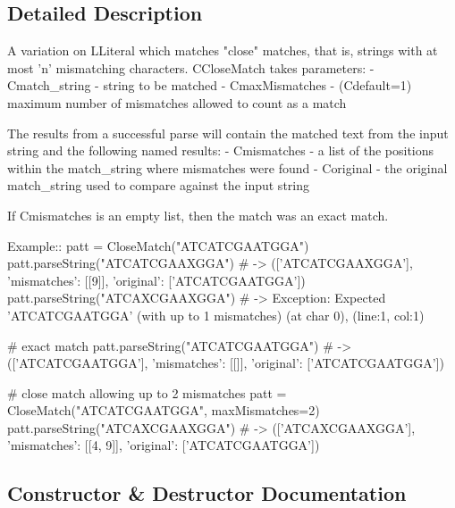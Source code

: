 \subsection{Detailed Description}
\begin{DoxyVerb}A variation on L{Literal} which matches "close" matches, that is, 
strings with at most 'n' mismatching characters. C{CloseMatch} takes parameters:
 - C{match_string} - string to be matched
 - C{maxMismatches} - (C{default=1}) maximum number of mismatches allowed to count as a match

The results from a successful parse will contain the matched text from the input string and the following named results:
 - C{mismatches} - a list of the positions within the match_string where mismatches were found
 - C{original} - the original match_string used to compare against the input string

If C{mismatches} is an empty list, then the match was an exact match.

Example::
    patt = CloseMatch("ATCATCGAATGGA")
    patt.parseString("ATCATCGAAXGGA") # -> (['ATCATCGAAXGGA'], {'mismatches': [[9]], 'original': ['ATCATCGAATGGA']})
    patt.parseString("ATCAXCGAAXGGA") # -> Exception: Expected 'ATCATCGAATGGA' (with up to 1 mismatches) (at char 0), (line:1, col:1)

    # exact match
    patt.parseString("ATCATCGAATGGA") # -> (['ATCATCGAATGGA'], {'mismatches': [[]], 'original': ['ATCATCGAATGGA']})

    # close match allowing up to 2 mismatches
    patt = CloseMatch("ATCATCGAATGGA", maxMismatches=2)
    patt.parseString("ATCAXCGAAXGGA") # -> (['ATCAXCGAAXGGA'], {'mismatches': [[4, 9]], 'original': ['ATCATCGAATGGA']})
\end{DoxyVerb}
 

\subsection{Constructor \& Destructor Documentation}
\mbox{\label{classsetuptools_1_1__vendor_1_1pyparsing_1_1CloseMatch_a695aa0fa9f33e51b1ee9495ddb5b052d}} 
